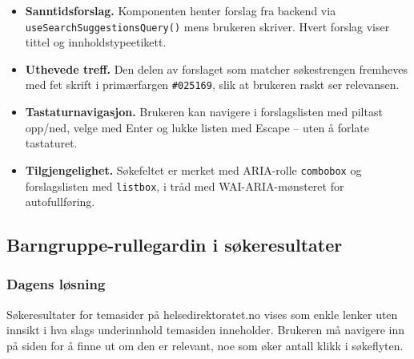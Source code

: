 \begin{itemize}
    \item \textbf{Sanntidsforslag.} Komponenten henter forslag fra
          backend via \texttt{useSearchSuggestionsQuery()} mens
          brukeren skriver. Hvert forslag viser tittel og
          innholdstypeetikett.

    \item \textbf{Uthevede treff.} Den delen av forslaget som matcher
          søkestrengen fremheves med fet skrift i primærfargen
          \texttt{\#025169}, slik at brukeren raskt ser relevansen.

    \item \textbf{Tastaturnavigasjon.} Brukeren kan navigere i
          forslagslisten med piltast opp/ned, velge med Enter og lukke
          listen med Escape -- uten å forlate tastaturet.

    \item \textbf{Tilgjengelighet.} Søkefeltet er merket med ARIA-rolle
          \texttt{combobox} og forslagslisten med \texttt{listbox},
          i tråd med WAI-ARIA-mønsteret for autofullføring.
\end{itemize}

\subsection{Barngruppe-rullegardin i søkeresultater}
\label{sec:barngruppe}

\subsubsection{Dagens løsning}
\label{sec:barngruppe-idag}


Søkeresultater for temasider på helsedirektoratet.no vises som enkle
lenker uten innsikt i hva slags underinnhold temasiden inneholder.
Brukeren må navigere inn på siden for å finne ut om den er relevant,
noe som øker antall klikk i søkeflyten.

